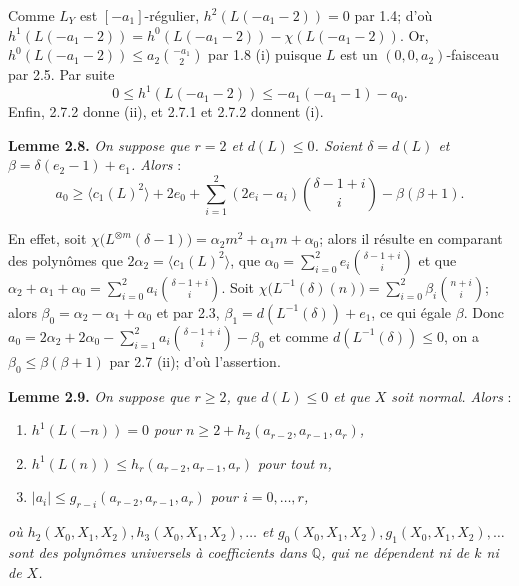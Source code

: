 
Comme \(L_Y\) est \([-a_1]\)-régulier, \(h^2(L(-a_1-2))=0\) par 1.4; d'où \(h^1(L(-a_1-2))=h^0(L(-a_1-2))-\chi(L(-a_1-2))\). Or, \(h^0(L(-a_1-2))\le a_2\binom{-a_1}{2}\) par 1.8 (i) puisque \(L\) est un \((0,0,a_2)\)-faisceau par 2.5. Par suite
\[
0\le h^1(L(-a_1-2))\le -a_1(-a_1-1)-a_0.
\tag{2.7.2}
\]
Enfin, 2.7.2 donne (ii), et 2.7.1 et 2.7.2 donnent (i).

\textbf{Lemme 2.8.} \emph{On suppose que \(r=2\) et \(d(L)\le0\). Soient \(\delta=d(L)\) et \(\beta=\delta(e_2-1)+e_1\). Alors} :
\[
a_0\ge
\langle c_1(L)^2\rangle+2e_0+
\sum_{i=1}^{2}(2e_i-a_i)\binom{\delta-1+i}{i}
-\beta(\beta+1).
\]

En effet, soit \(\chi\bigl(L^{\otimes m}(\delta-1)\bigr)=\alpha_2m^2+\alpha_1m+\alpha_0\); alors il résulte en comparant des polynômes que \(2\alpha_2=\langle c_1(L)^2\rangle\), que \(\alpha_0=\sum_{i=0}^{2}e_i\binom{\delta-1+i}{i}\) et que \(\alpha_2+\alpha_1+\alpha_0=\sum_{i=0}^{2}a_i\binom{\delta-1+i}{i}\). Soit \(\chi\bigl(L^{-1}(\delta)(n)\bigr)=\sum_{i=0}^{2}\beta_i\binom{n+i}{i}\); alors \(\beta_0=\alpha_2-\alpha_1+\alpha_0\) et par 2.3, \(\beta_1=d(L^{-1}(\delta))+e_1\), ce qui égale \(\beta\). Donc \(a_0=2\alpha_2+2\alpha_0-\sum_{i=1}^{2}a_i\binom{\delta-1+i}{i}-\beta_0\) et comme \(d(L^{-1}(\delta))\le0\), on a \(\beta_0\le\beta(\beta+1)\) par 2.7 (ii); d'où l'assertion.

\textbf{Lemme 2.9.} \emph{On suppose que \(r\ge2\), que \(d(L)\le0\) et que \(X\) soit normal. Alors} :
\begin{enumerate}[label=(\roman*)]
\item \emph{\(h^1(L(-n))=0\) pour \(n\ge2+h_2(a_{r-2},a_{r-1},a_r)\),}
\item \emph{\(h^1(L(n))\le h_r(a_{r-2},a_{r-1},a_r)\) pour tout \(n\),}
\item \emph{\(|a_i|\le g_{r-i}(a_{r-2},a_{r-1},a_r)\) pour \(i=0,\ldots,r\),}
\end{enumerate}
\emph{où \(h_2(X_0,X_1,X_2),h_3(X_0,X_1,X_2),\ldots\) et \(g_0(X_0,X_1,X_2),g_1(X_0,X_1,X_2),\ldots\) sont des polynômes universels à coefficients dans \(\mathbb Q\), qui ne dépendent ni de \(k\) ni de \(X\).}

